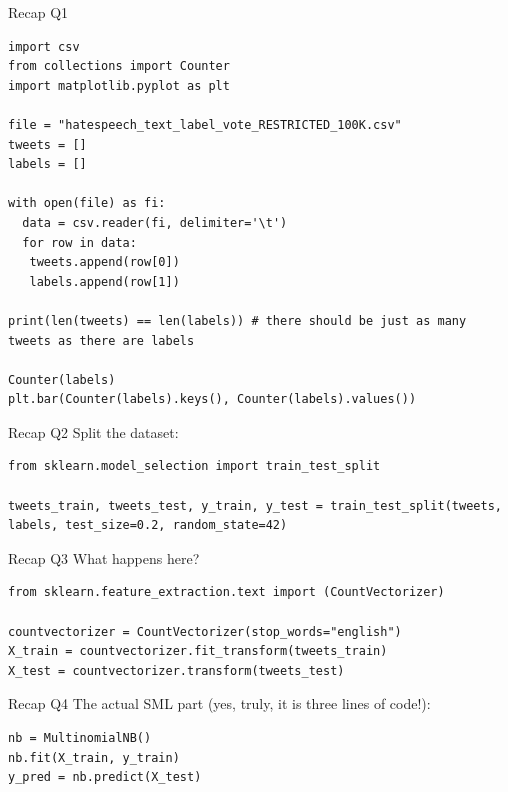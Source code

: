 \documentclass[compress]{beamer}
\begin{document}
\begin{frame}[fragile]{Recap Q1}
	
\begin{lstlisting}
import csv
from collections import Counter
import matplotlib.pyplot as plt
			
file = "hatespeech_text_label_vote_RESTRICTED_100K.csv"
tweets = []
labels = []
		
with open(file) as fi:
  data = csv.reader(fi, delimiter='\t')
  for row in data:
   tweets.append(row[0])
   labels.append(row[1])
		
print(len(tweets) == len(labels)) # there should be just as many tweets as there are labels
		
Counter(labels)
plt.bar(Counter(labels).keys(), Counter(labels).values())
\end{lstlisting}

\end{frame}



\begin{frame}[fragile]{Recap Q2}
Split the dataset:
\begin{lstlisting}
from sklearn.model_selection import train_test_split
		
tweets_train, tweets_test, y_train, y_test = train_test_split(tweets, labels, test_size=0.2, random_state=42)
\end{lstlisting}
	
\end{frame}


\begin{frame}[fragile]{Recap Q3}
What happens here?
\begin{lstlisting}
from sklearn.feature_extraction.text import (CountVectorizer)
		
countvectorizer = CountVectorizer(stop_words="english")
X_train = countvectorizer.fit_transform(tweets_train)
X_test = countvectorizer.transform(tweets_test)
\end{lstlisting}
\end{frame}



\begin{frame}[fragile]{Recap Q4}
The actual SML part (yes, truly, it is three lines of code!):
\begin{lstlisting}
nb = MultinomialNB()
nb.fit(X_train, y_train)
y_pred = nb.predict(X_test)
\end{lstlisting}
\end{frame}
\end{document}
